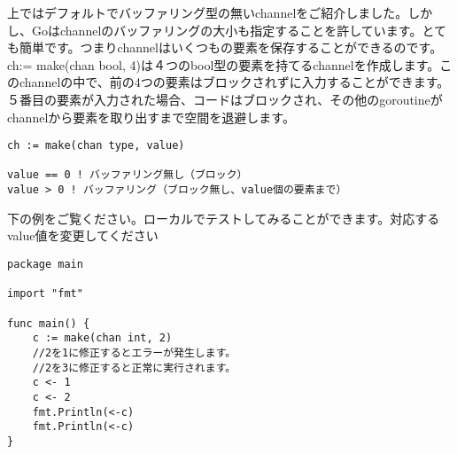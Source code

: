 上ではデフォルトでバッファリング型の無いchannelをご紹介しました。しかし、Goはchannelのバッファリングの大小も指定することを許しています。とても簡単です。つまりchannelはいくつもの要素を保存することができるのです。ch:= make(chan bool, 4)は４つのbool型の要素を持てるchannelを作成します。このchannelの中で、前の4つの要素はブロックされずに入力することができます。５番目の要素が入力された場合、コードはブロックされ、その他のgoroutineがchannelから要素を取り出すまで空間を退避します。


\begin{lstlisting}[numbers=none]
ch := make(chan type, value)

value == 0 ! バッファリング無し（ブロック）
value > 0 ! バッファリング（ブロック無し、value個の要素まで）
\end{lstlisting}

下の例をご覧ください。ローカルでテストしてみることができます。対応するvalue値を変更してください

\begin{lstlisting}[numbers=none]
package main

import "fmt"

func main() {
    c := make(chan int, 2)
    //2を1に修正するとエラーが発生します。
    //2を3に修正すると正常に実行されます。
    c <- 1
    c <- 2
    fmt.Println(<-c)
    fmt.Println(<-c)
}
\end{lstlisting}


